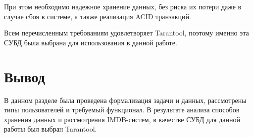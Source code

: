 При этом необходимо надежное хранение данных, без риска их потери даже в случае сбоя в системе, а также реализация ACID транзакций. 

Всем перечисленным требованиям удовлетворяет Tarantool, поэтому именно эта СУБД была выбрана для использования в данной работе.


\section*{Вывод}

В данном разделе была проведена формализация задачи и данных, рассмотрены типы пользователей и требуемый функционал.  В результате анализа способов хранения данных и рассмотрения IMDB-систем, в качестве СУБД для данной работы был выбран Tarantool. 

